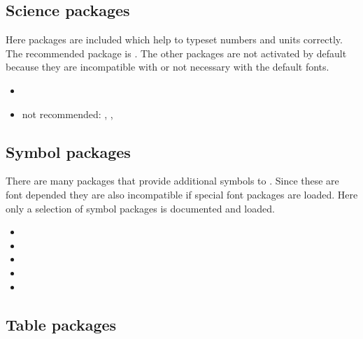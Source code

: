 
\subsection{Science packages}
\label{sec:packages:science}

Here packages are included which help to typeset numbers and units correctly.
The recommended package is . The other packages are not activated by default because they are incompatible with  or not necessary with the default fonts.

\begin{itemize}[noitemsep]
\item {}
\item not recommended: , ,  
\end{itemize}


\subsection{Symbol packages}
\label{sec:packages:symbols}

There are many packages that provide additional symbols to \latex . Since these are font depended they are also incompatible if special font packages are loaded. Here only a selection of symbol packages is documented and loaded.

\begin{itemize}[noitemsep]
\item {}
\item {}
\item {}
\item {}
\item {}
\end{itemize}


\subsection{Table packages}
\label{sec:packages:tables}

